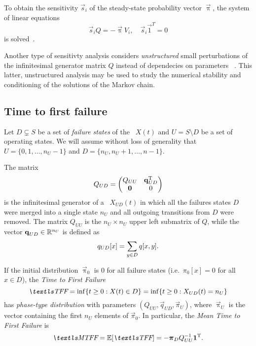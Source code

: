 To obtain the sensitivity $\vec{s}_i$ of the steady-state probability
vector $\vec{\uppi}$, the system of linear equations
\begin{equation}
  \label{eq:background:ctmc:sensitvity:s}
  \vec{s}_i Q = -\vec{\uppi} V_i, \quad \vec{s}_i \vec{1}^T = 0
\end{equation}
is solved~\citep{DBLP:conf/sigmetrics/BlakeRT88}.

Another type of sensitivty analysis considers \emph{unstructured}
small perturbations of the infinitesimal generator matrix $Q$ instead
of dependecies on parameters%
~\citep{funderlic1986sensitivity,ipsen1994uniform}. This latter,
unstructured analysis may be used to study the numerical stability and
conditioning of the solutions of the Markov chain.

\subsection{Time to first failure}

Let $D \subsetneq S$ be a set of \emph{failure states} of the \CTMC\ 
$X(t)$ and $U = S \setminus D$ be a set of operating states. We will
assume without loss of generality that $U = \{0, 1, \ldots, n_U - 1\}$
and $D = \{ n_U, n_U + 1, \ldots, n - 1 \}$.

The matrix
\begin{equation}
  Q_{UD} = \begin{pmatrix}
    Q_{UU} & \bm{\mathrm{q}}_{UD}^{\mathrm{T}} \\
    \bm{\mathrm{0}} & 0
  \end{pmatrix}
\end{equation}
is the infinitesimal generator of a \CTMC\ $X_{UD}(t)$ in which all
the failures states $D$ were merged into a single state $n_U$ and all
outgoing transitions from $D$ were removed. The matrix $Q_{UU}$ is the
$n_U \times n_U$ upper left submatrix of $Q$, while the vector
$\bm{\mathrm{q}}_{UD} \in \mathbb{R}^{n_U}$ is defined as
\begin{equation}
  q_{UD}[x] = \sum_{y \in D} q[x, y] \text.
\end{equation}

If the initial distribution $\vec{\uppi}_0$ is $0$ for all failure
states (i.e.~$\pi_0[x] = 0$ for all $x \in D$), the \emph{Time
  to First Failure}
\begin{equation}
  \TFF = \inf \{ t \ge 0 : X(t) \in D \} = \inf \{ t \ge 0 : X_{UD}(t)
  = n_U \}
\end{equation}
has \emph{phase-type distribution} with parameters
$(Q_{UU}, \vec{q}_{UD}, \vec{\pi}_{U})$, where $\vec{\uppi}_U$ is the
vector containing the first $n_U$ elements of $\vec{\pi}_0$. In
particular, the \emph{Mean Time to First Failure} is
\begin{equation}
  \MTFF = \Ex[\TFF] = - \vec{\pi}_D Q_{UU}^{-1} \vec{1}^\T \text.
\end{equation}

